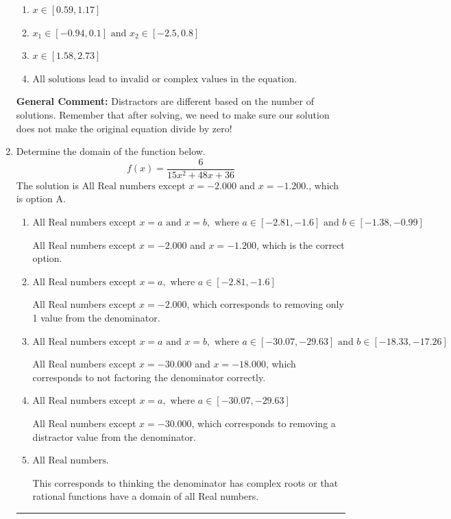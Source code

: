 \documentclass{extbook}[14pt]
\newcommand{\litem}[1]{\item #1

\rule{\textwidth}{0.4pt}}
\begin{document}
\begin{enumerate}
{\begin{enumerate}[label=\Alph*.]
* $x = -0.173 \text{ and } x = 2.238$, which is the correct option.
\item \( x \in [0.59,1.17] \)


\item \( x_1 \in [-0.94, 0.1] \text{ and } x_2 \in [-2.5,0.8] \)


\item \( x \in [1.58,2.73] \)


\item \( \text{All solutions lead to invalid or complex values in the equation.} \)


\end{enumerate}

\textbf{General Comment:} Distractors are different based on the number of solutions. Remember that after solving, we need to make sure our solution does not make the original equation divide by zero!
}
\litem{
Determine the domain of the function below.
\[ f(x) = \frac{6}{15x^{2} +48 x + 36} \]The solution is \( \text{All Real numbers except } x = -2.000 \text{ and } x = -1.200. \), which is option A.\begin{enumerate}[label=\Alph*.]
\item \( \text{All Real numbers except } x = a \text{ and } x = b, \text{ where } a \in [-2.81, -1.6] \text{ and } b \in [-1.38, -0.99] \)

All Real numbers except $x = -2.000$ and $x = -1.200$, which is the correct option.
\item \( \text{All Real numbers except } x = a, \text{ where } a \in [-2.81, -1.6] \)

All Real numbers except $x = -2.000$, which corresponds to removing only 1 value from the denominator.
\item \( \text{All Real numbers except } x = a \text{ and } x = b, \text{ where } a \in [-30.07, -29.63] \text{ and } b \in [-18.33, -17.26] \)

All Real numbers except $x = -30.000$ and $x = -18.000$, which corresponds to not factoring the denominator correctly.
\item \( \text{All Real numbers except } x = a, \text{ where } a \in [-30.07, -29.63] \)

All Real numbers except $x = -30.000$, which corresponds to removing a distractor value from the denominator.
\item \( \text{All Real numbers.} \)

This corresponds to thinking the denominator has complex roots or that rational functions have a domain of all Real numbers.
\end{enumerate}

}
\end{enumerate}
\end{document}
